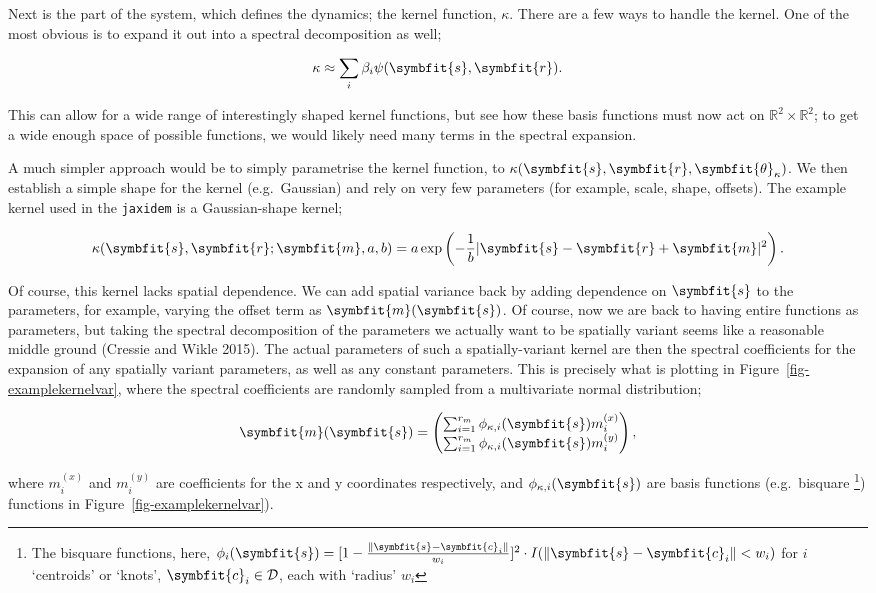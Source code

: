 \documentclass[
]{report}
\newcommand{\bv}[1]{\symbfit{#1}}
\theoremstyle{plain}
\theoremstyle{plain}
\theoremstyle{remark}
\begin{document}
Next is the part of the system, which defines the dynamics; the kernel
function, \(\kappa\). There are a few ways to handle the kernel. One of
the most obvious is to expand it out into a spectral decomposition as
well;

\[\kappa \approx \sum_i \beta_i\psi(\bv s, \bv r).
\]

This can allow for a wide range of interestingly shaped kernel
functions, but see how these basis functions must now act on
\(\mathbb R^2\times \mathbb R^2\); to get a wide enough space of
possible functions, we would likely need many terms in the spectral
expansion.

A much simpler approach would be to simply parametrise the kernel
function, to \(\kappa(\bv s, \bv r, \bv \theta_\kappa)\). We then
establish a simple shape for the kernel (e.g.~Gaussian) and rely on very
few parameters (for example, scale, shape, offsets). The example kernel
used in the \texttt{jaxidem} is a Gaussian-shape kernel;

\[\kappa(\bv s, \bv r; \bv m, a, b) = a \exp \left( -\frac{1}{b} \vert \bv s- \bv r +\bv m\vert^2 \right). 
\]

Of course, this kernel lacks spatial dependence. We can add spatial
variance back by adding dependence on \(\bv s\) to the parameters, for
example, varying the offset term as \(\bv m(\bv s)\). Of course, now we
are back to having entire functions as parameters, but taking the
spectral decomposition of the parameters we actually want to be
spatially variant seems like a reasonable middle ground (Cressie and
Wikle 2015). The actual parameters of such a spatially-variant kernel
are then the spectral coefficients for the expansion of any spatially
variant parameters, as well as any constant parameters. This is
precisely what is plotting in Figure~\ref{fig-examplekernelvar}, where
the spectral coefficients are randomly sampled from a multivariate
normal distribution;

\[\begin{split}
  \bv m(\bv s) = \left(\begin{matrix}
    \sum_{i=1}^{r_m} \phi_{\kappa,i}(\bv s) m^{(x)}_i\\
    \sum_{i=1}^{r_m} \phi_{\kappa,i}(\bv s) m^{(y)}_i
  \end{matrix}\right),
\end{split}
\]

where \(m^{(x)}_i\) and \(m^{(y)}_i\) are coefficients for the x and y
coordinates respectively, and \(\phi_{\kappa, i}(\bv s)\) are basis
functions (e.g.~bisquare \footnote{The bisquare functions, here,
  \(\phi_i(\bv s) = [1-\frac{\Vert \bv s - \bv c_i \Vert}{w_i}]^2 \cdot I(\Vert \bv s - \bv c_i \Vert < w_i)\)
  for \(i\) `centroids' or `knots', \(\bv c_i\in \mathcal D\), each with
  `radius' \(w_i\)}) functions in Figure~\ref{fig-examplekernelvar}).
\end{document}
